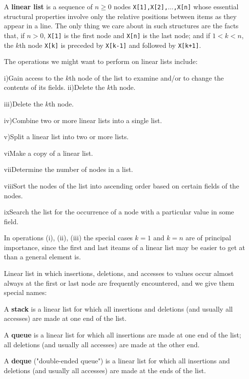 A {\bf linear list} is a sequence of $n\geq 0$ nodes {\tt X[1],X[2],$\ldots$,X[n]} whose essential structural properties involve only the relative positions between  items as they appear in a line. The only thing we care about in such structures are the facts that, if $n>0$, {\tt X[1]} is the first node and {\tt X[n]} is the last node; and if $1<k<n$, the $k$th node {\tt X[k]} is preceded by {\tt X[k-1]} and followed by {\tt X[k+1]}.

\vskip 1mm
The operations we might want to perform on linear lists include:

\vskip 2mm
{\rm i)}\qquad Gain access to the $k$th node of the list to examine and/or to change the contents of its fields.
\vskip 2mm
{\rm ii)}\qquad Delete the $k$th node.

\vskip 2mm
{\rm iii)}\qquad Delete the $k$th node.

\vskip 2mm
{\rm iv)}\qquad Combine two or more linear lists into a single list.

\vskip 2mm
{\rm v)}\qquad Split a linear list into two or more lists.

\vskip 2mm
{\rm vi}\qquad Make a copy of a linear list.

\vskip 2mm
{\rm vii}\qquad Determine the number of nodes in a list.

\vskip 2mm
{\rm viii}\qquad Sort the nodes of the list into ascending order based on certain fields of the nodes.

\vskip 2mm
{\rm ix}\qquad Search the list for the occurrence of a node with a particular value in some field.

\vskip 3mm
In operations {\rm (i), (ii), (iii)} the special cases $k=1$ and $k=n$ are of principal importance, since the first and last iteams of a linear list may be easier to get at than a general element is.

\vskip 3mm
Linear list in which insertions, deletions, and accesses to values occur almost always at the first or last node are frequently encountered, and we give them special names:

\vskip 2mm
A {\bf stack} is a linear list for which all insertions and deletions (and usually all accesses) are made at one end of the list.

\vskip 2mm
A {\bf queue} is a linear list for which all insertions are made at one end of the list; all deletions (and usually all accesses) are made at the other end.

\vskip 2mm
A {\bf deque} ("double-ended queue") is a linear list for which all insertions and deletions (and usually all accesses) are made at the ends of the list.


\vfill\eject
\bye
